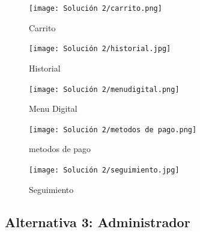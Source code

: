 \documentclass{article}
\begin{document}
\begin{doublespace}
    \begin{figure}[H]
        \centering
        \vspace*{1cm}
        \texttt{[image: Solución 2/carrito.png]}
        \caption{Carrito}
        \label{fig:Carrito}
    \end{figure}
    \begin{figure}[H]
        \centering
        \vspace*{1cm}
        \texttt{[image: Solución 2/historial.jpg]}
        \caption{Historial}
        \label{fig:Historial}
    \end{figure}
    \begin{figure}[H]
        \centering
        \vspace*{1cm}
        \texttt{[image: Solución 2/menudigital.png]}
        \caption{Menu Digital}
        \label{fig:Menu-Digital}
    \end{figure}
    \begin{figure}[H]
        \centering
        \vspace*{1cm}
        \texttt{[image: Solución 2/metodos de pago.png]}
        \caption{metodos de pago}
        \label{fig:Metodos-de-pago}
    \end{figure}
    \begin{figure}[H]
        \centering
        \vspace*{1cm}
        \texttt{[image: Solución 2/seguimiento.jpg]}
        \caption{Seguimiento}
        \label{fig:Seguimiento}
    \end{figure}
    
    \subsection{Alternativa 3: Administrador}


\end{doublespace}
\end{document}
